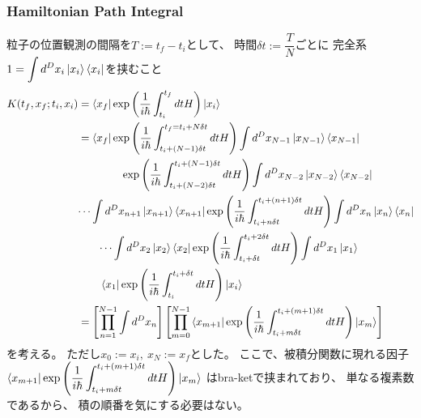 \subsubsection{Hamiltonian Path Integral}

粒子の位置観測の間隔を$T := t_f - t_i$として、
時間$\delta t := \dfrac{ T }{ N }$ごとに
完全系$\displaystyle
    1 = \int d^D {x_i}
        \ket{ x_i }
        \bra{ x_i }
$を挟むこと
\begin{align}
    K( t_f, x_f ; t_i, x_i )
&=
    \bra{ x_f }
        \exp\left(
            \dfrac{ 1 }{ i\hbar }
            \int_{t_i}^{t_f} dt
            H
        \right)
    \ket{ x_i }
\notag\\&=
    \bra{ x_f }
    \exp\left(
        \dfrac{1}{i\hbar}
        \int_{t_i + (N-1) \delta t}
            ^{t_f = t_i + N \delta t}
        dt H
    \right)
    \int d^D x_{N-1}
        \ket{ x_{N-1} }
        \bra{ x_{N-1} }
\notag\\&\qquad\qquad
    \exp\left(
        \dfrac{1}{i\hbar}
        \int_{t_i + (N-2) \delta t}
            ^{t_i + (N-1) \delta t}
        dt H
    \right)
    \int d^D x_{N-2}
        \ket{ x_{N-2} }
        \bra{ x_{N-2} }
\notag\\&\dots
    \int d^D x_{n+1}
        \ket{ x_{n+1} }
        \bra{ x_{n+1} }
    \exp\left(
        \dfrac{1}{i\hbar}
        \int_{t_i + n \delta t}
            ^{t_i + (n+1) \delta t}
        dt H
    \right)
    \int d^D x_n
        \ket{ x_n }
        \bra{ x_n }
\notag\\&\qquad\dots
    \int d^D x_2
        \ket{ x_2 }
        \bra{ x_2 }
    \exp\left(
        \dfrac{1}{i\hbar}
        \int_{t_i + \delta t}
        ^{t_i + 2 \delta t}
        dt H
    \right)
    \int d^D x_1
        \ket{ x_1 }
\notag\\&\qquad
        \bra{ x_1 }
    \exp\left(
        \dfrac{1}{i\hbar}
        \int_{t_i}
        ^{t_i + \delta t}
        dt H
    \right)
    \ket{ x_i }
\notag\\&=
    \left[
        \prod_{n=1}^{N-1}
        \int d^D x_n
    \right]
    \left[
        \prod_{m=0}^{N-1}
        \bra{ x_{m+1} }
        \exp\left(
            \dfrac{1}{i\hbar}
            \int_{t_i + m \delta t}
            ^{t_i + (m+1) \delta t}
            dt H
        \right)
        \ket{ x_m }
    \right]
\end{align}
を考える。
ただし$x_0 := x_i,\ x_N := x_f$とした。
ここで、被積分関数に現れる因子
$\displaystyle
\bra{ x_{m+1} }
    \exp\left(
        \dfrac{1}{i\hbar}
        \int_{t_i + m \delta t}
        ^{t_i + (m+1) \delta t}
        dt H
    \right)
\ket{ x_m }$
はbra-ketで挟まれており、
単なる複素数であるから、
積の順番を気にする必要はない。

